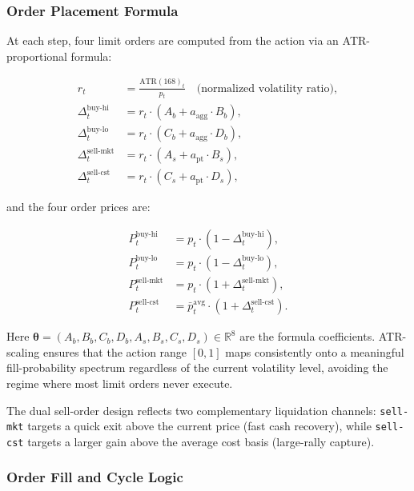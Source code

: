\documentclass[11pt, a4paper]{article}
\begin{document}
\subsubsection*{Order Placement Formula}

At each step, four limit orders are computed from the action via an
ATR-proportional formula:

\begin{align}
    r_t &= \frac{\text{ATR}(168)_t}{p_t}
           \quad \text{(normalized volatility ratio)}, \label{eq:atr_ratio} \\[4pt]
    \Delta^\text{buy-hi}_t  &= r_t \cdot (A_b + a_\text{agg}\cdot B_b), \label{eq:buy_hi} \\
    \Delta^\text{buy-lo}_t  &= r_t \cdot (C_b + a_\text{agg}\cdot D_b), \label{eq:buy_lo} \\
    \Delta^\text{sell-mkt}_t &= r_t \cdot (A_s + a_\text{pt}\cdot B_s), \label{eq:sell_mkt} \\
    \Delta^\text{sell-cst}_t &= r_t \cdot (C_s + a_\text{pt}\cdot D_s), \label{eq:sell_cst}
\end{align}

and the four order prices are:

\begin{align}
    P^\text{buy-hi}_t  &= p_t\cdot(1 - \Delta^\text{buy-hi}_t), \\
    P^\text{buy-lo}_t  &= p_t\cdot(1 - \Delta^\text{buy-lo}_t), \\
    P^\text{sell-mkt}_t &= p_t\cdot(1 + \Delta^\text{sell-mkt}_t), \\
    P^\text{sell-cst}_t &= \bar{p}^\text{avg}_t\cdot(1 + \Delta^\text{sell-cst}_t).
\end{align}

Here $\bm{\theta} = (A_b, B_b, C_b, D_b, A_s, B_s, C_s, D_s) \in \mathbb{R}^8$
are the formula coefficients.
ATR-scaling ensures that the action range $[0,1]$ maps consistently onto a
meaningful fill-probability spectrum regardless of the current volatility level,
avoiding the regime where most limit orders never execute.

The dual sell-order design reflects two complementary liquidation channels:
\texttt{sell-mkt} targets a quick exit above the current price (fast cash recovery),
while \texttt{sell-cst} targets a larger gain above the average cost basis (large-rally
capture).

\subsubsection*{Order Fill and Cycle Logic}
\end{document}

